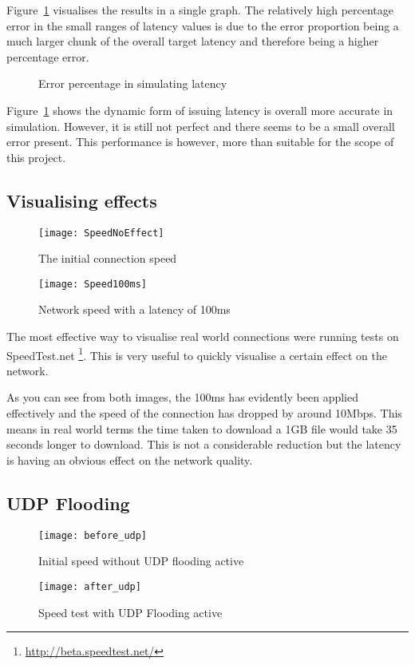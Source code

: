 Figure~\ref{ref:latencyAccuracy} visualises the results in a single graph. The relatively high percentage error in the small ranges of latency values is due to the error proportion being a much larger chunk of the overall target latency and therefore being a higher percentage error.

\begin{center}
	
	\begin{figure}[h]
		\caption{Error percentage in simulating latency}
		\label{ref:latencyAccuracy}
	\end{figure}
\end{center}


Figure~\ref{ref:latencyAccuracy} shows the dynamic form of issuing latency is overall more accurate in simulation. However, it is still not perfect and there seems to be a small overall error present. This performance is however, more than suitable for the scope of this project.

\subsection{Visualising effects}
\begin{wrapfigure}{r}{5cm}
\begin{center}
	\texttt{[image: SpeedNoEffect]}
	\caption{The initial connection speed}
	\texttt{[image: Speed100ms]}
	\caption{Network speed with a latency of 100ms}
\end{center}
\end{wrapfigure}

The most effective way to visualise real world connections were running tests on SpeedTest.net \footnote{\url{http://beta.speedtest.net/}}. This is very useful to quickly visualise a certain effect on the network.

As you can see from both images, the 100ms has evidently been applied effectively and the speed of the connection has dropped by around 10Mbps. This means in real world terms the time taken to download a 1GB file would take 35 seconds longer to download. This is not a considerable reduction but the latency is having an obvious effect on the network quality.


\subsection{UDP Flooding}
\begin{wrapfigure}{r}{5cm}
\begin{center}
	\texttt{[image: before\_udp]}
	\caption{Initial speed without UDP flooding active}
	\texttt{[image: after\_udp]}
	\caption{Speed test with UDP Flooding active}
\end{center}
\end{wrapfigure}

